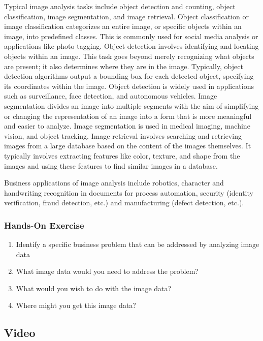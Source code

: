 Typical image analysis tasks include object detection and counting, object classification, image segmentation, and image retrieval. Object classification or image classification categorizes an entire image, or specific objects within an image, into predefined classes. This is commonly used for social media analysis or applications like photo tagging. Object detection involves identifying and locating objects within an image. This task goes beyond merely recognizing what objects are present; it also determines where they are in the image. Typically, object detection algorithms output a bounding box for each detected object, specifying its coordinates within the image. Object detection is widely used in applications such as surveillance, face detection, and autonomous vehicles. Image segmentation divides an image into multiple segments with the aim of simplifying or changing the representation of an image into a form that is more meaningful and easier to analyze. Image segmentation is used in medical imaging, machine vision, and object tracking. Image retrieval involves searching and retrieving images from a large database based on the content of the images themselves. It typically involves extracting features like color, texture, and shape from the images and using these features to find similar images in a database. 

Business applications of image analysis include robotics, character and handwriting recognition in documents for process automation, security (identity verification, fraud detection, etc.) and manufacturing (defect detection, etc.).

\begin{tcolorbox}[colback=code]
\subsubsection*{Hands-On Exercise} 

\begin{enumerate}
	\item Identify a specific business problem that can be addressed by analyzing image data
	\item What image data would you need to address the problem?
	\item What would you wish to do with the image data?
	\item Where might you get this image data?
\end{enumerate}
\end{tcolorbox}

\subsection*{Video}

